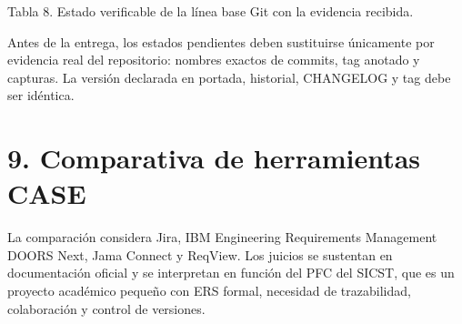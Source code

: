 \documentclass[12pt]{article}
\begin{document}
Tabla 8. Estado verificable de la línea base Git con la evidencia recibida.

Antes de la entrega, los estados pendientes deben sustituirse únicamente por evidencia real del repositorio: nombres exactos de commits, tag anotado y capturas. La versión declarada en portada, historial, CHANGELOG y tag debe ser idéntica.

\section{\texorpdfstring{9. Comparativa de herramientas CASE}{9. Comparativa de herramientas CASE}}\label{comparativa-de-herramientas-case}

La comparación considera Jira, IBM Engineering Requirements Management DOORS Next, Jama Connect y ReqView. Los juicios se sustentan en documentación oficial y se interpretan en función del PFC del SICST, que es un proyecto académico pequeño con ERS formal, necesidad de trazabilidad, colaboración y control de versiones.
\end{document}

